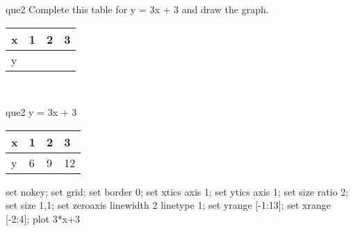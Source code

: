 \documentclass[13.5pt, varwidth=true]{beamer}
\begin{document}
\begin{frame}[shrink=19,fragile]
	\begin{beamercolorbox}[rounded=true, left, shadow=true,wd=14.8cm]{que2}
		 Complete this table for y = 3x + 3 and draw the graph. \\[0.3cm] \renewcommand{\arraystretch}{1.2}\begin{tabular}{|C|C|C|C|} \hline x & 1 & 2 & 3 \\ \hline y & & & \\ \hline \end{tabular}\\[0.3cm]
	\end{beamercolorbox}
\end{frame}
\begin{frame}[shrink=19,fragile]
	\begin{beamercolorbox}[rounded=true, left, shadow=true,wd=14.8cm]{que2}
		y = 3x + 3\renewcommand{\arraystretch}{1.2}\begin{tabular}{|C|C|C|C|} \hline x & 1 & 2 & 3 \\ \hline y & 6 & 9 & 12\\ \hline \end{tabular}\begin{gnuplot}[terminal=pdf] set nokey; set grid; set border 0; set xtics axis 1; set ytics axis 1; set size ratio 2; set size 1,1; set zeroaxis linewidth 2 linetype 1; set yrange [-1:13]; set xrange [-2:4]; plot 3*x+3 \end{gnuplot}
	\end{beamercolorbox}
\end{frame}
\end{document}
